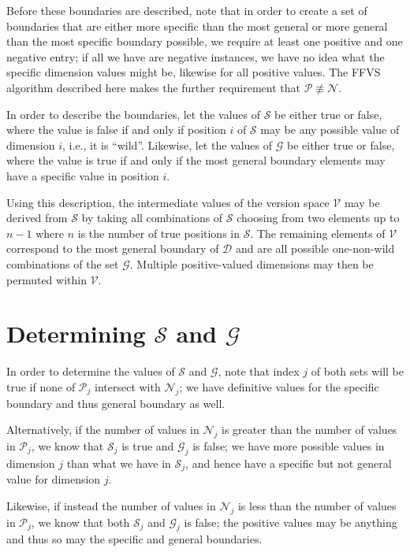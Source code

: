 Before these boundaries are described, note that in order to create a set of boundaries that are either more specific than the most general or more general than the most specific boundary possible, we require at least one positive and one negative entry; if all we have are negative instances, we have no idea what the specific dimension values might be, likewise for all positive values.  The FFVS algorithm described here makes the further requirement that $\mathcal{P} \not\equiv \mathcal{N}$.

In order to describe the boundaries, let the values of $\mathcal{S}$ be either true or false, where the value is false if and only if position $i$ of $\mathcal{S}$ may be any possible value of dimension $i$, i.e., it is ``wild''.  Likewise, let the values of $\mathcal{G}$ be either true or false, where the value is true if and only if the most general boundary elements may have a specific value in position $i$.

Using this description, the intermediate values of the version space $\mathcal{V}$ may be derived from $\mathcal{S}$ by taking all combinations of $\mathcal{S}$ choosing from two elements up to $n-1$ where $n$ is the number of true positions in $\mathcal{S}$.  The remaining elements of $\mathcal{V}$ correspond to the most general boundary of $\mathcal{D}$ and are all possible one-non-wild combinations of the set $\mathcal{G}$.  Multiple positive-valued dimensions may then be permuted within $\mathcal{V}$.

\section*{Determining $\mathcal{S}$ and $\mathcal{G}$}

In order to determine the values of $\mathcal{S}$ and $\mathcal{G}$, note that index $j$ of both sets will be true if none of $\mathcal{P}_j$ intersect with $\mathcal{N}_j$; we have definitive values for the specific boundary and thus general boundary as well.  

Alternatively, if the number of values in $\mathcal{N}_j$ is greater than the number of values in $\mathcal{P}_j$, we know that $\mathcal{S}_j$ is true and $\mathcal{G}_j$ is false; we have more possible values in dimension $j$ than what we have in $\mathcal{S}_j$, and hence have a specific but not general value for dimension $j$.  

Likewise, if instead the number of values in $\mathcal{N}_j$ is less than the number of values in $\mathcal{P}_j$, we know that both $\mathcal{S}_j$ and $\mathcal{G}_j$ is false; the positive values may be anything and thus so may the specific and general boundaries.  

